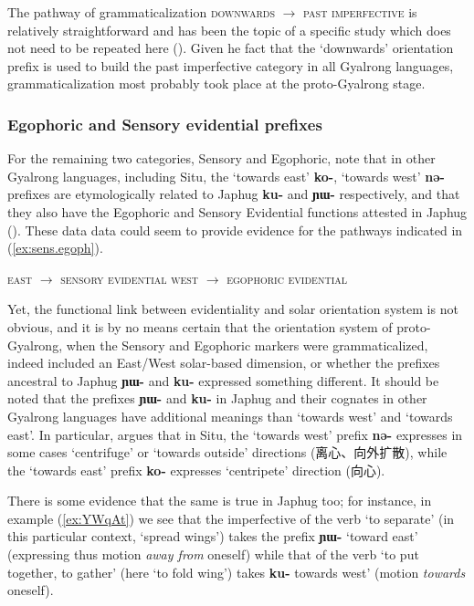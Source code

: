 \documentclass[oldfontcommands,oneside,a4paper,11pt]{article}
\newcommand{\ipa}[1]{\mbox{\phon\textbf{#1}}} %
\newcommand{\zh}[1]{{\cn #1}}
\begin{document}
The pathway of grammaticalization \textsc{downwards} $\rightarrow $ \textsc{past imperfective} is relatively straightforward and has been the topic of a specific study which does not need to be repeated here (\citealt{lin11direction}). Given he fact that the `downwards' orientation prefix is used to build the past imperfective category in all Gyalrong languages, grammaticalization most probably took place at the proto-Gyalrong stage.

\subsubsection{Egophoric and Sensory evidential prefixes} \label{sec:egoph}

For the remaining two categories, Sensory and Egophoric, note that in other Gyalrong languages, including Situ, the `towards east' \ipa{ko-}, `towards west' \ipa{nə-} prefixes are etymologically related to Japhug \ipa{ku-} and \ipa{ɲɯ-} respectively, and that they also have the Egophoric and Sensory Evidential functions attested in Japhug (\citealt{lin02dimension}). These data data could seem to provide evidence for the pathways indicated in (\ref{ex:sens.egoph}).


\begin{exe}
\ex \label{ex:sens.egoph}
\glt \textsc{east} $\rightarrow $ \textsc{sensory evidential} 
\glt \textsc{west} $\rightarrow $ \textsc{egophoric evidential}
\end{exe}

Yet, the functional link between evidentiality and solar orientation system is not obvious, and it is by no means certain that the orientation system of proto-Gyalrong, when the Sensory and Egophoric markers were grammaticalized, indeed included an East/West solar-based dimension, or whether the prefixes ancestral to Japhug \ipa{ɲɯ-} and \ipa{ku-} expressed something different.  It should be noted that the prefixes  \ipa{ɲɯ-} and \ipa{ku-} in Japhug and their cognates in other Gyalrong languages have additional meanings than `towards west' and `towards east'. In particular, \citet[228-9]{linxr93jiarong} argues that in Situ, the `towards west' prefix \ipa{nə-} expresses in some cases `centrifuge' or `towards outside' directions (\zh{离心、向外扩散}), while the `towards east' prefix \ipa{ko-} expresses `centripete' direction (\zh{向心}). 

There is some evidence that the same is true in Japhug too; for instance, in example (\ref{ex:YWqAt}) we see that the imperfective of the verb `to separate' (in this particular context, `spread wings') takes the prefix \ipa{ɲɯ-} `toward east' (expressing thus motion \textit{away from} oneself) while that of the verb `to put together, to gather' (here `to fold wing') takes \ipa{ku-}  towards west' (motion \textit{towards} oneself).
\end{document}
